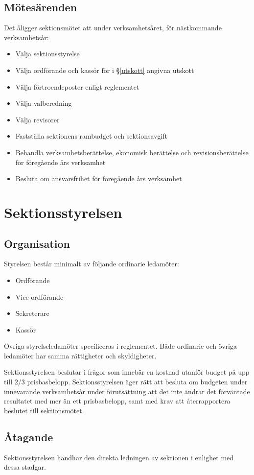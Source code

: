 \documentclass{datateknologsektionen-document}
\begin{document}
\subsection{Mötesärenden}
Det åligger sektionsmötet att under verksamhetsåret, för nästkommande verksamhetsår:
\begin{itemize}
  \item Välja sektionsstyrelse
  \item Välja ordförande och kassör för i \S \ref{utskott} angivna utskott
  \item Välja förtroendeposter enligt reglementet
  \item Välja valberedning
  \item Välja revisorer
  \item Fastställa sektionens rambudget och sektionsavgift
  \item Behandla verksamhetsberättelse, ekonomisk berättelse och revisionsberättelse för föregående års verksamhet
  \item Besluta om ansvarsfrihet för föregående års verksamhet
\end{itemize}

\section{Sektionsstyrelsen}
\subsection{Organisation}
Styrelsen består minimalt av följande ordinarie ledamöter:
\begin{itemize}
  \item Ordförande
  \item Vice ordförande
  \item Sekreterare
  \item Kassör
\end{itemize}

Övriga styrelseledamöter specificeras i reglementet. Både ordinarie och övriga ledamöter
har samma rättigheter och skyldigheter.

Sektionsstyrelsen beslutar i frågor som innebär en kostnad utanför budget på upp till 2/3 prisbasbelopp.
Sektionsstyrelsen äger rätt att besluta om budgeten under innevarande verksamhetsår under förutsättning
att det inte ändrar det förväntade resultatet med mer än ett prisbasbelopp, samt med krav att
återrapportera beslutet till sektionsmötet.

\subsection{Åtagande}
Sektionsstyrelsen handhar den direkta ledningen av sektionen i enlighet med dessa stadgar.
\end{document}
